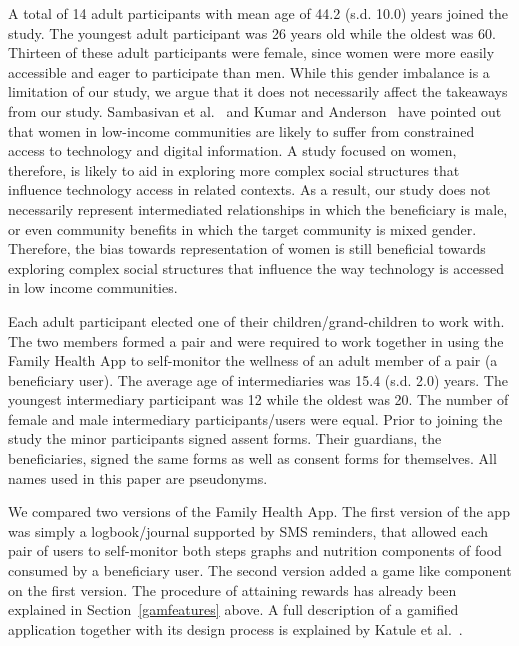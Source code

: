 \documentclass{sig-alternate}
\begin{document}
A total of 14 adult participants with mean age of 44.2 (s.d. 10.0) years joined the study.  The youngest adult participant was 26 years old while the oldest was 60. Thirteen of these adult participants were female, since women were more easily accessible and eager to participate than men. While this gender imbalance is a limitation of our study, we argue that it does not necessarily affect the takeaways from our study. Sambasivan et al.~\cite{sambasivan2010} and Kumar and Anderson~\cite{kumar2015mobile} have pointed out that women in low-income communities are likely to suffer from constrained access to technology and digital information. A study focused on women, therefore, is likely to aid in exploring more complex social structures that influence technology access in related contexts. As a result, our study does not necessarily represent intermediated relationships in which the beneficiary is male, or even community benefits in which the target community is mixed gender. Therefore, the bias towards representation of women is still beneficial towards exploring complex social structures that influence the way technology is accessed in low income communities.

Each adult participant elected one of their children/grand-children to work with. The two members formed a pair and were required to work together in using the Family Health App to self-monitor the wellness of an adult member of a pair (a beneficiary user). The average age of intermediaries was 15.4 (s.d. 2.0) years. The youngest intermediary participant was 12 while the oldest was 20. The number of female and male intermediary participants/users were equal. Prior to joining the study the minor participants signed assent forms. Their guardians, the beneficiaries, signed the same forms as well as consent forms for themselves. All names used in this paper are pseudonyms.
  
We compared two versions of the Family Health App. The first version of the app was simply a logbook/journal supported by SMS reminders, that allowed each pair of users to self-monitor both steps graphs and nutrition components of food consumed by a beneficiary user. The second version added a game like component on the first version. The procedure of attaining rewards has already been explained in Section~\ref{gamfeatures} above. A full description of a gamified application together with its design process is explained by Katule et al.~\cite{katule2016:leveraging}.
\end{document}
